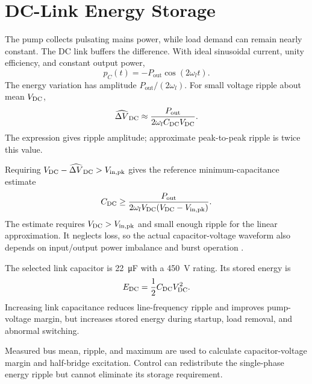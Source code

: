 \section{DC-Link Energy Storage}
\label{sec:analysis-dclink}

The pump collects pulsating mains power, while load demand can remain nearly constant. The DC link buffers the difference. With ideal sinusoidal current, unity efficiency, and constant output power,
\begin{equation}
p_C(t)=-P_{\mathrm{out}}\cos(2\omega_l t).
\end{equation}
The energy variation has amplitude \(P_{\mathrm{out}}/(2\omega_l)\). For small voltage ripple about mean \(V_{\mathrm{DC}}\),
\begin{equation}
\widehat{\Delta V}_{\mathrm{DC}}\approx
\frac{P_{\mathrm{out}}}{2\omega_lC_{\mathrm{DC}}V_{\mathrm{DC}}}.
\label{eq:analysis-bus-ripple}
\end{equation}
The expression gives ripple amplitude; approximate peak-to-peak ripple is twice this value.

Requiring \(V_{\mathrm{DC}}-\widehat{\Delta V}_{\mathrm{DC}}>V_{\mathrm{in,pk}}\) gives the reference minimum-capacitance estimate
\begin{equation}
C_{\mathrm{DC}}\geq\frac{P_{\mathrm{out}}}
{2\omega_lV_{\mathrm{DC}}(V_{\mathrm{DC}}-V_{\mathrm{in,pk}})}.
\label{eq:cdc-sizing}
\end{equation}
The estimate requires \(V_{\mathrm{DC}}>V_{\mathrm{in,pk}}\) and small enough ripple for the linear approximation. It neglects loss, so the actual capacitor-voltage waveform also depends on input/output power imbalance and burst operation \cite{ammar2021led}.

The selected link capacitor is \SI{22}{\micro\farad} with a \SI{450}{\volt} rating. Its stored energy is
\begin{equation}
E_{\mathrm{DC}}=\frac{1}{2}C_{\mathrm{DC}}V_{\mathrm{DC}}^2.
\end{equation}
Increasing link capacitance reduces line-frequency ripple and improves pump-voltage margin, but increases stored energy during startup, load removal, and abnormal switching.

Measured bus mean, ripple, and maximum are used to calculate capacitor-voltage margin and half-bridge excitation. Control can redistribute the single-phase energy ripple but cannot eliminate its storage requirement.
